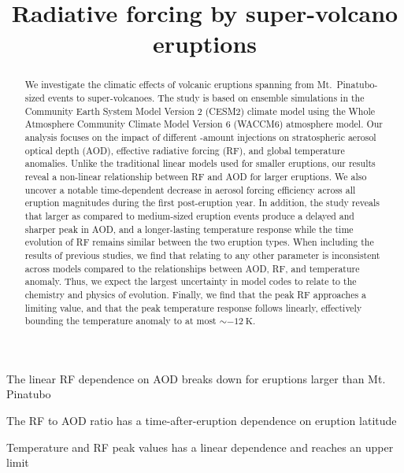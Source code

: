 \documentclass[draft]{agujournal2019}
\begin{document}
%
%

\title{Radiative forcing by super-volcano eruptions}

%
%




\begin{keypoints}
  \item The linear RF dependence on AOD breaks down for eruptions larger than Mt. Pinatubo
  \item The RF to AOD ratio has a time-after-eruption dependence on eruption latitude
  \item Temperature and RF peak values has a linear dependence and reaches an upper limit
\end{keypoints}

\begin{abstract}
  We investigate the climatic effects of volcanic eruptions spanning from Mt.\
  Pinatubo-sized events to super-volcanoes. The study is based on ensemble simulations
  in the Community Earth System Model Version 2 (CESM2) climate model using the Whole
  Atmosphere Community Climate Model Version 6 (WACCM6) atmosphere model. Our analysis
  focuses on the impact of different \ce{SO2}-amount injections on stratospheric aerosol
  optical depth (AOD), effective radiative forcing (RF), and global temperature
  anomalies. Unlike the traditional linear models used for smaller eruptions, our
  results reveal a non-linear relationship between RF and AOD for larger eruptions. We
  also uncover a notable time-dependent decrease in aerosol forcing efficiency across
  all eruption magnitudes during the first post-eruption year. In addition, the study
  reveals that larger as compared to medium-sized eruption events produce a delayed and
  sharper peak in AOD, and a longer-lasting temperature response while the time
  evolution of RF remains similar between the two eruption types. When including the
  results of previous studies, we find that relating \ce{SO2} to any other parameter is
  inconsistent across models compared to the relationships between AOD, RF, and
  temperature anomaly. Thus, we expect the largest uncertainty in model codes to relate
  to the chemistry and physics of \ce{SO2} evolution. Finally, we find that the peak RF
  approaches a limiting value, and that the peak temperature response follows linearly,
  effectively bounding the temperature anomaly to at most \(\sim\SI{-12}{\kelvin}\).
\end{abstract}
\end{document}

